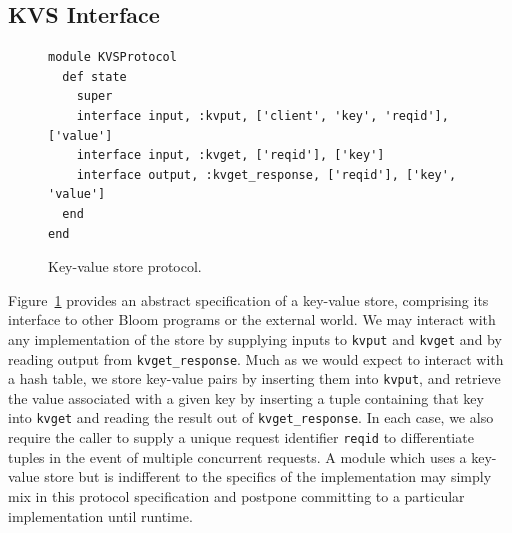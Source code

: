 \subsection{KVS Interface}

\begin{figure}[t]
\begin{scriptsize}
\begin{lstlisting}
module KVSProtocol
  def state
    super
    interface input, :kvput, ['client', 'key', 'reqid'], ['value']
    interface input, :kvget, ['reqid'], ['key']
    interface output, :kvget_response, ['reqid'], ['key', 'value']
  end
end
\end{lstlisting}
\centering
\vspace{-10pt}
\caption{Key-value store protocol.}
\label{fig:kvs-proto}
\end{scriptsize}
\vspace{-2pt}
\end{figure}

Figure~\ref{fig:kvs-proto} provides an abstract specification of a key-value store,
comprising its interface to other Bloom programs or the external world.  
We may interact with any implementation of the store
by supplying inputs to \texttt{kvput} and \texttt{kvget} and by reading output from
\texttt{kvget\_response}.  
Much as we would expect to interact
with a hash table, we store key-value pairs by inserting them into \texttt{kvput}, and 
retrieve the value associated with a given key by inserting a tuple containing that key
into \texttt{kvget} and reading the result out of \texttt{kvget\_response}.  In each case,
we also require the caller to supply a unique request identifier \texttt{reqid} to differentiate
tuples in the event of multiple concurrent requests.
A module which uses a key-value store but is indifferent
to the specifics of the implementation may simply mix in this protocol specification
and postpone committing to a particular implementation until runtime.

